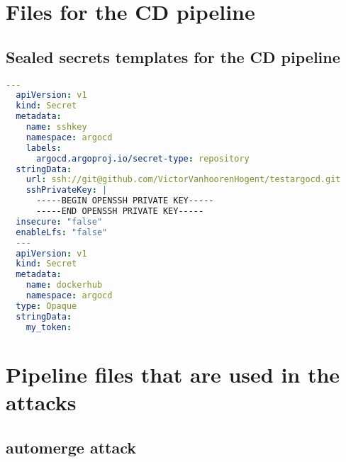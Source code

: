 \section{
{Files for the CD pipeline}}
\label{sec:Bestanden voor de CD pipeline}

\subsection{
{Sealed secrets templates for the CD pipeline}}
\label{sec:Sealed secrets templates voor de CD pipeline}

\begin{lstlisting}[language=yaml, style=yamlstyle]
  ---
  apiVersion: v1
  kind: Secret
  metadata:
    name: sshkey
    namespace: argocd
    labels:
      argocd.argoproj.io/secret-type: repository
  stringData:
    url: ssh://git@github.com/VictorVanhoorenHogent/testargocd.git
    sshPrivateKey: |
      -----BEGIN OPENSSH PRIVATE KEY-----
      -----END OPENSSH PRIVATE KEY-----
  insecure: "false"
  enableLfs: "false"
  ---
  apiVersion: v1
  kind: Secret
  metadata:
    name: dockerhub
    namespace: argocd
  type: Opaque
  stringData:
    my_token: 
\end{lstlisting}

\section{
{Pipeline files that are used in the attacks}}
\label{sec:Pipeline bestanden die gebruikt worden bij de aanvallen}

\subsection{
{automerge attack}}
\label{sec:Automerge aanval}


